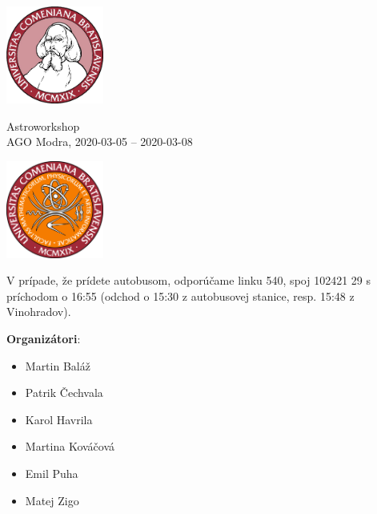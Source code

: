 \documentclass[a4paper]{report}
\begin{document}
    \begin{minipage}{\textwidth}
        \begin{minipage}{0.2\textwidth}
            \includegraphics[width=32mm]{input/logo.jpg}
        \end{minipage}
        \begin{minipage}{0.58\textwidth}
            \centering
            \fontsize{40}{50}\selectfont
            Astroworkshop\\
            \Large
            AGO Modra, 2020-03-05 -- 2020-03-08
        \end{minipage}
        \begin{minipage}{0.2\textwidth}
            \includegraphics[width=32mm]{input/fmfi.png}
        \end{minipage}
    \end{minipage}
    \vspace*{10mm}

    V prípade, že prídete autobusom, odporúčame linku 540, spoj 102421 29 s príchodom o 16:55
    (odchod o 15:30 z autobusovej stanice, resp. 15:48 z Vinohradov).

    \textbf{Organizátori}:
    \begin{itemize}[itemsep=0mm]
                        \item Martin Baláž
                                \item Patrik Čechvala
                                \item Karol Havrila
                                \item Martina Kováčová
                                \item Emil Puha
                                \item Matej Zigo
                                                                                                                                                                                                                                                                                                    \end{itemize}
\end{document}
